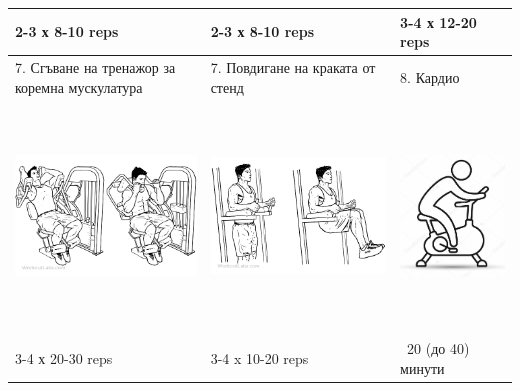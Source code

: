 \documentclass{article}
\begin{document}
\begin{tabular}{ | m{5cm} | m{5cm} | m{5cm} | }
2-3 х 8-10 reps & 2-3 х 8-10 reps & 3-4 х 12-20 reps \\ 
\hline
7. Сгъване на тренажор за коремна мускулатура  & 7. Повдигане на краката от стенд & 8. Кардио \\ 
\begin{minipage}{5cm} \includegraphics[width=\linewidth, height=60mm]{day_A_ex_7_Ab_Crunch_Machine1.png} \end{minipage} &
\begin{minipage}{5cm} \includegraphics[width=\linewidth, height=60mm]{day_A_ex_7_Knee_Hip_Raise.png} \end{minipage} & 
\begin{minipage}{5cm} \includegraphics[width=\linewidth, height=60mm]{day_A_ex_8_cardio.jpg} \end{minipage} \\
3-4 х 20-30 reps & 3-4 x 10-20 reps & ~20 (до 40) минути \\ 
\hline
\end{tabular}
\end{document}
